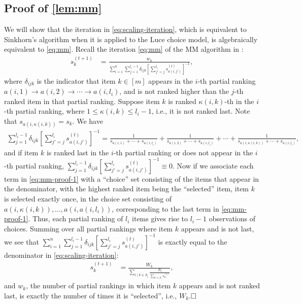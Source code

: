  \subsection{Proof of \cref{lem:mm}}
We will show that the iteration in \eqref{eq:scaling-iteration}, which is equivalent to Sinkhorn's algorithm when it is applied to the Luce choice model, is algebraically equivalent to \eqref{eq:mm}. Recall the iteration \eqref{eq:mm} of the MM algorithm in \citet{hunter2004mm}:
\begin{align*}
s_{k}^{(t+1)} & =\frac{w_{k}}{\sum_{i=1}^{n}\sum_{j=1}^{l_{i}-1}\delta_{ijk}[\sum_{j'=j}^{l_{i}}s_{a(i,j')}^{(t)}]^{-1}},
\end{align*}
where $\delta_{ijk}$ is the indicator that item $k\in[m]$ appears in the $i$-th partial ranking $a(i,1)\rightarrow a(i,2)\rightarrow \cdots \rightarrow a(i,l_{i})$, and is not ranked higher than the $j$-th ranked item in that partial ranking. Suppose item $k$ is ranked $\kappa(i,k)$-th in the $i$-th partial ranking,  where $1\leq \kappa(i,k)\leq l_i-1$, i.e., it is not ranked last. Note that $s_{a(i,\kappa(i,k))}=s_k$. We have
\begin{align}
\label{eq:mm-proof-1}
\sum_{j=1}^{l_{i}-1}\delta_{ijk}[\sum_{j'=j}^{l_{i}}s_{a(i,j')}^{(t)}]^{-1} = \frac{1}{s_{a(i,1)}+\cdots+s_{a(i,l_i)}}+\frac{1}{s_{a(i,2)}+\cdots+s_{a(i,l_i)}}+\cdots+\frac{1}{s_{a(i,\kappa(i,k))}+\cdots+s_{a(i,l_i)}},
\end{align}
and if item $k$ is ranked last in the $i$-th partial ranking or does not appear in the $i$-th partial ranking, $\sum_{j=1}^{l_{i}-1}\delta_{ijk}[\sum_{j'=j}^{l_{i}}s_{a(i,j')}^{(t)}]^{-1}\equiv0$. Now if we associate each term in \eqref{eq:mm-proof-1} with a ``choice'' set consisting of the items that appear in the denominator, with the highest ranked item being the ``selected'' item, item $k$ is selected exactly once, in the choice set consisting of $a(i,\kappa(i,k)), \dots,a(i,a(i,l_i))$, corresponding to the last term in \eqref{eq:mm-proof-1}. Thus, each partial ranking of $l_i$ items gives rise to $l_i-1$ observations of choices. Summing over all partial rankings where item $k$ appears and is not last, we see that ${\sum_{i=1}^{n}\sum_{j=1}^{l_{i}-1}\delta_{ijk}[\sum_{j'=j}^{l_{i}}s_{a(i,j')}^{(t)}]^{-1}}$ is exactly equal to the denominator in \eqref{eq:scaling-iteration}:
\begin{align*}
s_{k}^{(t+1)} & =\frac{W_{k}}{\sum_{i\mid k\in S_{i}}\frac{R_i}{\sum_{k'\in S_{i}}s_{k'}^{(t)}}},
\end{align*}
and $w_k$, the number of partial rankings in which item $k$ appears and is not ranked last, is exactly the number of times it is ``selected'', i.e., $W_k$.$\hfill \square$

